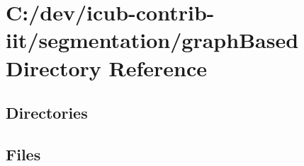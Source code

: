 \section{C\+:/dev/icub-\/contrib-\/iit/segmentation/graph\+Based Directory Reference}
\label{dir_810a9d323a6c62904b9f192dc2ad08ed}
\subsection*{Directories}
\begin{DoxyCompactItemize}
\end{DoxyCompactItemize}
\subsection*{Files}
\begin{DoxyCompactItemize}
\end{DoxyCompactItemize}
